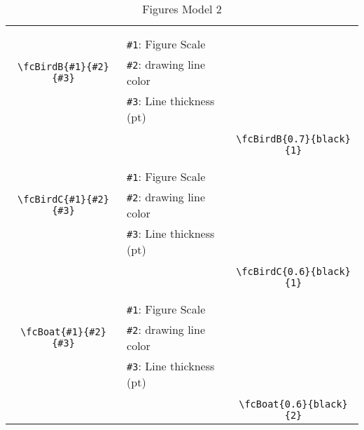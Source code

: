 \documentclass[x11names]{article}
\begin{document}
\begin{table}[H]
\begin{tabular}{|c|l|c|}
	&&\multirow{5}{*}{\fcBirdB{0.7}{black}{1}}\\	&&\\	&\verb|#1|: Figure Scale &\\	\verb|\fcBirdB{#1}{#2}{#3}|&	\verb|#2|: drawing line color &\\	&\verb|#3|: Line thickness (pt) &\\ &&\\&&	\verb|\fcBirdB{0.7}{black}{1}|\\\hline 	
	&&\multirow{5}{*}{\fcBirdC{0.6}{black}{1}}\\	&&\\	&\verb|#1|: Figure Scale &\\	\verb|\fcBirdC{#1}{#2}{#3}|&	\verb|#2|: drawing line color &\\	&\verb|#3|: Line thickness (pt) &\\ &&\\&&	\verb|\fcBirdC{0.6}{black}{1}|\\\hline 	
	&&\multirow{5}{*}{\fcBoat{0.6}{black}{2}}\\	&&\\	&\verb|#1|: Figure Scale &\\	\verb|\fcBoat{#1}{#2}{#3}|&	\verb|#2|: drawing line color &\\	&\verb|#3|: Line thickness (pt) &\\ &&\\&&	\verb|\fcBoat{0.6}{black}{2}|\\\hline 	\hline\end{tabular}\caption{Figures Model 2}\label{tab2}\end{table}
\end{document}
